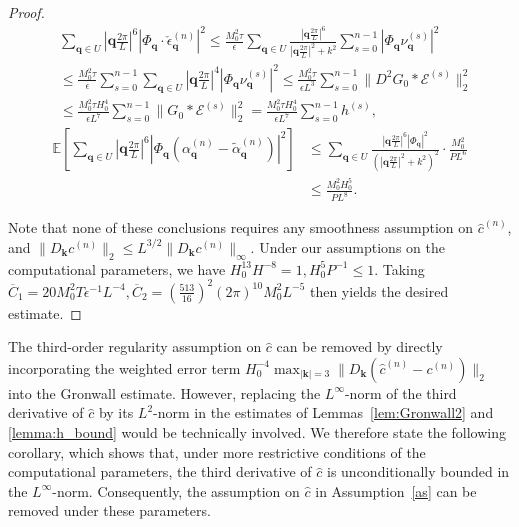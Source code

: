 \documentclass[review,onefignum,onetabnum]{siamart250211}
\begin{document}
\begin{proof}
\begin{equation}
  \begin{aligned}
    &\sum_{\mathbf{q} \in U} \left| \mathbf{q} \frac{2\pi}{L}\right|^6\left|\Phi_{\mathbf q} \cdot \check{\epsilon}_{\mathbf{q}}^{(n)} \right|^2 
    \leq \frac{M_0^2 \tau}{\epsilon} \sum_{\mathbf{q} \in U} \frac{|\mathbf{q}\frac{2\pi}{L}|^6}{|\mathbf{q}\frac{2\pi}{L}|^2 + k^2} \sum_{s=0}^{n-1} \left|\Phi_{\mathbf q}\nu_{\mathbf{q}}^{(s)}\right|^2 \\
    &\leq \frac{M_0^2 \tau}{\epsilon} \sum_{s=0}^{n-1} \sum_{\mathbf{q} \in U} \left| \mathbf{q} \frac{2\pi}{L}\right|^4 \left|\Phi_{\mathbf q}\nu_{\mathbf{q}}^{(s)}\right|^2\leq \frac{M_0^2 \tau}{\epsilon L^3} \sum_{s=0}^{n-1} \|D^2  G_0 \ast\mathcal{E}^{(s)}\|_2^2\\
    &\leq \frac{M_0^2 \tau H_0^4}{\epsilon L^7} \sum_{s=0}^{n-1} \|G_0 \ast\mathcal{E}^{(s)}\|_2^2 =\frac{M_0^2 \tau H_0^4}{\epsilon L^7} \sum_{s=0}^{n-1} h^{(s)},
  \end{aligned}
  \label{eq:energy_sum_low_freq23}
\end{equation}
\begin{equation}
\begin{aligned}
\mathbb{E}\left[\sum_{\mathbf{q} \in U} \left| \mathbf{q}\frac{2\pi}{L}\right|^6\left|\Phi_{\mathbf q}(\alpha^{(n)}_{\mathbf{q}} - \tilde{\alpha}^{(n)}_{\mathbf{q}}) \right|^2 \right]
&\leq \sum_{\mathbf{q} \in U} \frac{|\mathbf{q}\frac{2\pi}{L}|^6|\Phi_{\mathbf q}|^2}{(|\mathbf{q}\frac{2\pi}{L}|^2 + k^2)^2} \cdot \frac{M_0^2}{PL^6}\\
&\leq \frac{M_0^2 H_0^5}{P L^8}.
\end{aligned}
\label{eq:random_low_freq3}
\end{equation}

Note that none of these conclusions requires any smoothness assumption on $\hat{c}^{(n)}$, and $\|D_{\mathbf{k}} c^{(n)}\|_2 \leq L^{3/2} \|D_{\mathbf{k}} c^{(n)}\|_\infty$. Under our assumptions on the computational parameters, we have $H_0^{13}H^{-8}=1,H_0^5 P^{-1} \leq 1$. Taking $\overline{C}_1=20M_0^2 T \epsilon^{-1}L^{-4},\overline{C}_2= (\frac{513}{16})^2 (2\pi)^{10}M_0^2 L^{-5}$ then yields the desired estimate.
\end{proof}

The third-order regularity assumption on $\hat{c}$ can be removed by directly incorporating the weighted error term $H_0^{-4}\max_{|\mathbf{k}|=3}\lVert D_{\mathbf{k}}(\hat{c}^{(n)}-c^{(n)})\rVert_2$ into the Gronwall estimate. However, replacing the $L^\infty$-norm of the third derivative of $\hat{c}$ by its $L^2$-norm in the estimates of Lemmas~\ref{lem:Gronwall2} and \ref{lemma:h_bound} would be technically involved. We therefore state the following corollary, which shows that, under more restrictive conditions of the computational parameters, the third derivative of $\hat{c}$ is unconditionally bounded in the $L^\infty$-norm. Consequently, the assumption on $\hat{c}$ in Assumption~\ref{as} can be removed under these parameters.
\end{document}
